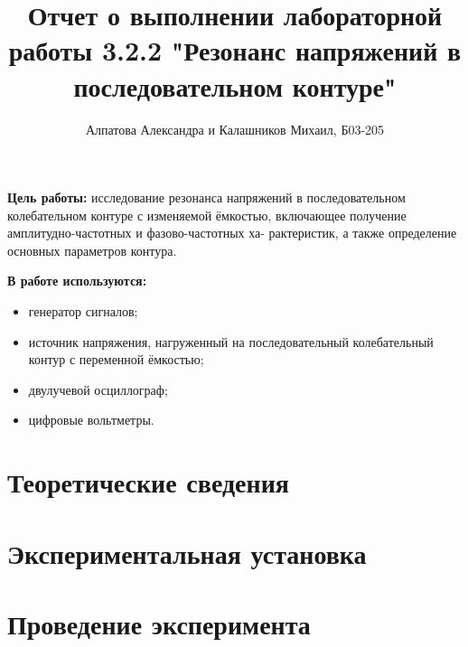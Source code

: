 \documentclass[14pt, a4paper]{report}
\title{\textbf{Отчет о выполнении лабораторной работы 3.2.2 "Резонанс напряжений в последовательном контуре"}}
\author{Алпатова Александра и Калашников Михаил, Б03-205}
\date{}
\begin{document}
\maketitle

\textbf{Цель работы:}
исследование резонанса напряжений в последовательном колебательном контуре с
изменяемой ёмкостью, включающее получение амплитудно-частотных и фазово-частотных ха-
рактеристик, а также определение основных параметров контура.
\newline

\textbf{В работе используются:}
\begin{itemize}
\item генератор сигналов;
\item источник напряжения, нагруженный на последовательный колебательный контур с переменной ёмкостью;
\item двулучевой осциллограф;
\item цифровые вольтметры.
\end{itemize}

\section{Теоретические сведения}

\section{Экспериментальная установка}

\section{Проведение эксперимента}
\end{document}
